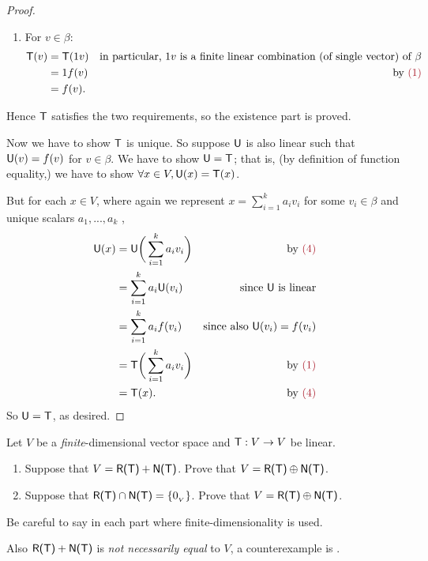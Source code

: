\begin{proof}
\begin{enumerate}
\item
For \(v \in \beta\):
\begin{align*}
    \T(v) & = \T(1 v) & \text{in particular, \(1v\) is a finite linear combination (of single vector) of \(\beta\)} \\
            & = 1 f(v) & \text{by \MAROON{(1)}} \\
            & = f(v).
\end{align*}
\end{enumerate}
Hence \(\textsf{T}\) satisfies the two requirements, so the existence part is proved.

Now we have to show \(\textsf{T}\) is unique.
So suppose \(\textsf{U}\) is also linear such that \(\textsf{U}(v) = f(v)\) for \(v \in \beta\).
We have to show \(\textsf{U} = \textsf{T}\);
that is, (by definition of function equality,) we have to show \(\forall x \in V, \textsf{U}(x) = \textsf{T}(x)\).

But for each \(x \in V\), where again we represent \(x = \sum_{i = 1}^k a_i v_i\) for some \(v_i \in \beta\) and unique scalars \(a_1, ..., a_k\) ,
\begin{align*}
    \U(x) & = \U\bigg(\sum_{i = 1}^k a_i v_i\bigg) & \text{by \MAROON{(4)}}\\
           & = \sum_{i = 1}^k a_i \U(v_i) & \text{since \(\U\) is linear} \\
           & = \sum_{i = 1}^k a_i f(v_i) & \text{since also \(\U(v_i) = f(v_i)\)} \\
           & = \T\bigg(\sum_{i = 1}^k a_i v_i\bigg) & \text{by \MAROON{(1)}} \\
           & = \T(x). & \text{by \MAROON{(4)}}
\end{align*}
So \(\textsf{U} = \textsf{T}\), as desired.
\end{proof}

\begin{exercise} \label{exercise 2.1.36}
Let \(V\) be a \emph{finite}-dimensional vector space and \(\textsf{T} : V \to V\) be linear.
\begin{enumerate}
\item Suppose that \(V = \textsf{R(T)} + \textsf{N(T)}\).
    Prove that \(V = \textsf{R(T)} \oplus \textsf{N(T)}\).
\item Suppose that \(\textsf{R(T)} \cap \textsf{N(T)} = \{ 0_{_V} \}\).
    Prove that \(V = \textsf{R(T)} \oplus \textsf{N(T)}\).
\end{enumerate}

Be careful to say in each part where finite-dimensionality is used.

Also  \(\textsf{R(T)} + \textsf{N(T)}\) is \emph{not necessarily equal} to \(V\), a counterexample is .
\end{exercise}


